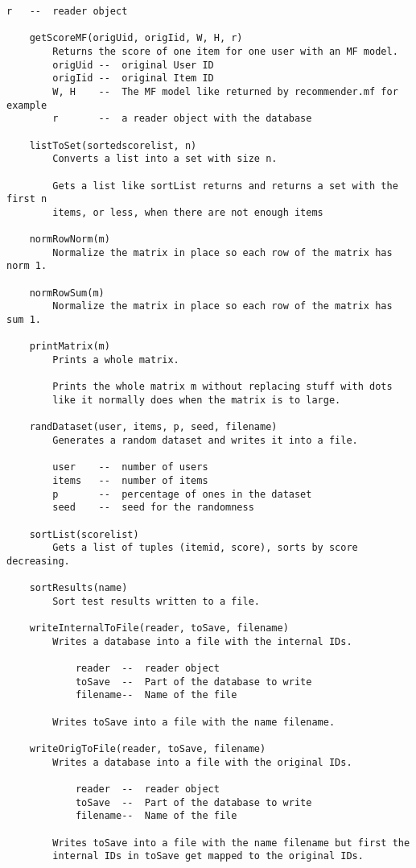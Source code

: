 \begin{lstlisting}[style=docstring]
        r   --  reader object
    
    getScoreMF(origUid, origIid, W, H, r)
        Returns the score of one item for one user with an MF model.
        origUid --  original User ID
        origIid --  original Item ID
        W, H    --  The MF model like returned by recommender.mf for example
        r       --  a reader object with the database
    
    listToSet(sortedscorelist, n)
        Converts a list into a set with size n.
        
        Gets a list like sortList returns and returns a set with the first n
        items, or less, when there are not enough items
    
    normRowNorm(m)
        Normalize the matrix in place so each row of the matrix has norm 1.
    
    normRowSum(m)
        Normalize the matrix in place so each row of the matrix has sum 1.
    
    printMatrix(m)
        Prints a whole matrix.
        
        Prints the whole matrix m without replacing stuff with dots
        like it normally does when the matrix is to large.
    
    randDataset(user, items, p, seed, filename)
        Generates a random dataset and writes it into a file.
        
        user    --  number of users
        items   --  number of items
        p       --  percentage of ones in the dataset
        seed    --  seed for the randomness
    
    sortList(scorelist)
        Gets a list of tuples (itemid, score), sorts by score decreasing.
    
    sortResults(name)
        Sort test results written to a file.
    
    writeInternalToFile(reader, toSave, filename)
        Writes a database into a file with the internal IDs.
        
            reader  --  reader object
            toSave  --  Part of the database to write
            filename--  Name of the file
        
        Writes toSave into a file with the name filename.
    
    writeOrigToFile(reader, toSave, filename)
        Writes a database into a file with the original IDs.
        
            reader  --  reader object
            toSave  --  Part of the database to write
            filename--  Name of the file
        
        Writes toSave into a file with the name filename but first the
        internal IDs in toSave get mapped to the original IDs.
\end{lstlisting}

